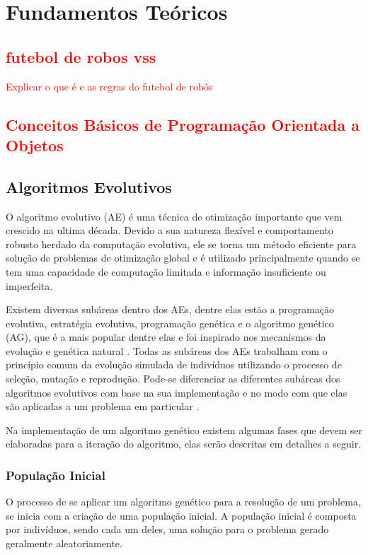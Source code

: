 \chapter{Fundamentos Teóricos}

\section{\textcolor{red}{futebol de robos vss}}
\textcolor{red}{Explicar o que é e as regras do futebol de robôs \cite{IEEE2008}}

\section{\textcolor{red}{Conceitos Básicos de Programação Orientada a Objetos}}

\section{Algoritmos Evolutivos}
O algoritmo evolutivo (AE) é uma técnica de otimização importante que vem crescido na ultima década. Devido a sua natureza flexível e comportamento robusto herdado da computação evolutiva, ele se torna um método eficiente para solução de problemas de otimização global e é utilizado principalmente quando se tem uma capacidade de computação limitada e informação insuficiente ou imperfeita. 

Existem diversas subáreas dentro dos AEs, dentre elas estão a programação evolutiva, estratégia evolutiva, programação genética e o algoritmo genético (AG), que é a mais popular dentre elas e foi inspirado nos mecanismos da evolução e genética natural \cite{Srinivas1994}. Todas as subáreas dos AEs trabalham com o princípio comum da evolução simulada de indivíduos utilizando o processo de seleção, mutação e reprodução. Pode-se diferenciar as diferentes subáreas dos algoritmos evolutivos com base na sua implementação e no modo com que elas são aplicadas a um problema em particular \cite{Vikhar2017}.

Na implementação de um algoritmo genético existem algumas fases que devem ser elaboradas para a iteração do algoritmo, elas serão descritas em detalhes a seguir.

\subsection{População Inicial}

O processo de se aplicar um algoritmo genético para a resolução de um problema, se inicia com a criação de uma população inicial. A população inicial é composta por indivíduos, sendo cada um deles, uma solução para o problema gerado geralmente aleatoriamente.

